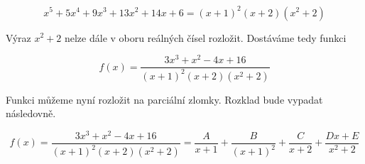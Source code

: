 \begin{displaymath}
	x^5+5x^4+9x^3+13x^2+14x+6 = (x+1)^2(x+2)(x^2+2)
\end{displaymath}

Výraz $x^2+2$ nelze dále v oboru reálných čísel rozložit. Dostáváme tedy funkci

\begin{displaymath}
f(x)=\frac{3x^3+x^2-4x+16}{(x+1)^2(x+2)(x^2+2)}
\end{displaymath}

Funkci můžeme nyní rozložit na parciální zlomky. Rozklad bude vypadat následovně.

\begin{displaymath}
f(x)=\frac{3x^3+x^2-4x+16}{(x+1)^2(x+2)(x^2+2)}
=
\frac{A}{x+1} +
\frac{B}{(x+1)^2} +
\frac{C}{x+2} +
\frac{Dx+E}{x^2+2}
\end{displaymath}


